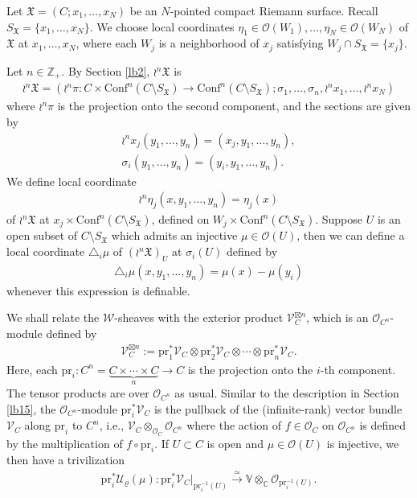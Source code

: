\documentclass[12pt,a4paper,notitlepage]{article}
\theoremstyle{definition}
\theoremstyle{plain}
\newcommand{\fk}{\mathfrak}
\newcommand{\mc}{\mathcal}
\newcommand{\Conf}{\mathrm{Conf}}
\newcommand{\scr}{\mathscr}
\newcommand{\SX}{{S_{\fk X}}}
\newcommand{\Vbb}{\mathbb V}
\newcommand{\Cbb}{\mathbb C}
\newcommand{\Zbb}{\mathbb Z}
\newcommand{\pr}{\mathrm {pr}}
\numberwithin{equation}{section}
\begin{document}
Let $\fk X=(C;x_1,\dots,x_N)$ be an $N$-pointed compact Riemann surface. Recall $\SX=\{x_1,\dots,x_N\}$. We choose local coordinates $\eta_1\in\scr O(W_1),\dots,\eta_N\in\scr O(W_N)$ of $\fk X$ at $x_1,\dots,x_N$, where each $W_j$ is a neighborhood of $x_j$ satisfying $W_j\cap\SX=\{x_j\}$.

Let $n\in\Zbb_+$. By Section \ref{lb2}, $\wr^n\fk X$ is 
\begin{align*}
\wr^n\fk X=(\wr^n\pi:C\times\Conf^n(C\setminus\SX)\rightarrow\Conf^n(C\setminus\SX);\sigma_1,\dots,\sigma_n,\wr^nx_1,\dots,\wr^nx_N) 
\end{align*}
where $\wr^n\pi$ is the projection onto the second component, and the sections are given by
\begin{gather*}
\wr^nx_j(y_1,\dots,y_n)=(x_j,y_1,\dots,y_n),	\\
\sigma_i(y_1,\dots,y_n)=(y_i,y_1,\dots,y_n).	
\end{gather*}
We define local coordinate 
\begin{align}
	\wr^n\eta_j(x,y_1,\dots,y_n)=\eta_j(x)
\end{align}
of $\wr^n\fk X$ at $x_j\times\Conf^n(C\setminus\SX)$, defined on $W_j\times\Conf^n(C\setminus\SX)$. Suppose $U$ is an open subset of $C\setminus\SX$ which admits an injective $\mu\in\scr O(U)$, then we can define a local coordinate $\triangle_i\mu$ of $(\wr^n\fk X)_U$ at $\sigma_i(U)$ defined by 
\begin{align}
\triangle_i\mu(x,y_1,\dots,y_n)=\mu(x)-\mu(y_i)	
\end{align}
whenever this expression is definable.


We shall relate the $\scr W$-sheaves with the exterior product $\scr V_C^{\boxtimes n}$, which is an $\scr O_{C^n}$-module defined by
\begin{align}
\scr V_C^{\boxtimes n}:=	\pr_1^*\scr V_C\otimes\pr_2^*\scr V_C\otimes\cdots\otimes\pr_n^*\scr V_C.
\end{align}
Here, each $\pr_i:C^n=\underbrace{C\times\cdots\times C}_n\rightarrow C$ is the projection onto the $i$-th component. The tensor products are over $\scr O_{C^n}$ as usual. Similar to the description in Section \ref{lb15}, the $\scr O_{C^n}$-module $\pr_i^*\scr V_C$ is the pullback of the (infinite-rank) vector bundle $\scr V_C$ along $\pr_i$ to $C^n$, i.e., $\scr V_C\otimes_{\scr O_{C}}\scr O_{C^n}$ where the action of $f\in\scr O_C$ on $\scr O_{C^n}$ is defined by the multiplication of $f\circ\pr_i$. If $U\subset C$ is open and $\mu\in\scr O(U)$ is injective, we then have a trivilization
\begin{align*}
\pr_i^*\mc U_\varrho(\mu):\pr_i^*\scr V_C\big|_{\pr_i^{-1}(U)}\xrightarrow{\simeq}\Vbb\otimes_\Cbb\scr O_{\pr_i^{-1}(U)}.	
\end{align*}
\end{document}
